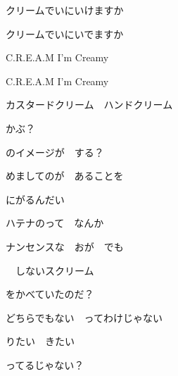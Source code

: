 \documentclass[a4paper,tate,twocolumn,12pt]{ltjtarticle}
\begin{document}
\thispagestyle{empty}

\begin{center}
{\LARGE クリームでいにいけますか}
\end{center}

\vspace{1em}

\begin{flushleft}

\noindent\begin{minipage}{\linewidth}
クリームでいにいでますか

C.R.E.A.M I'm Creamy

C.R.E.A.M I'm Creamy
\end{minipage}

\vspace{2em}

\noindent\begin{minipage}{\linewidth}
カスタードクリーム　ハンドクリーム

かぶ？

のイメージが　する？

めましてのが　あることを

にがるんだい
\end{minipage}

\vspace{2em}

\noindent\begin{minipage}{\linewidth}
ハテナのって　なんか

ナンセンスな　おが　でも

　しないスクリーム

をかべていたのだ？
\end{minipage}

\vspace{2em}

\noindent\begin{minipage}{\linewidth}
どちらでもない　ってわけじゃない

りたい　きたい

ってるじゃない？
\end{minipage}


\end{flushleft}
\end{document}
